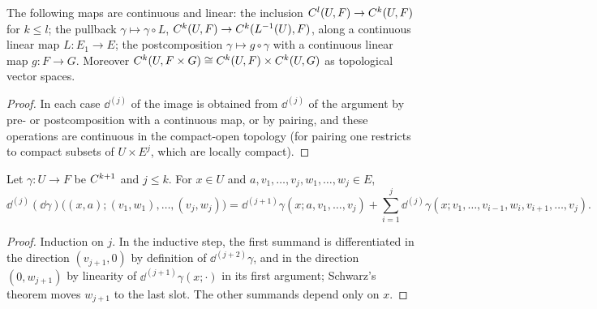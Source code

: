 \begin{proposition}
  \label{prop:ck-linear-operations}
  \leanok
  The following maps are continuous and linear: the inclusion
  $C^{l}(U, F) \to C^{k}(U, F)$ for $k \leq l$; the pullback $\gamma \mapsto \gamma \circ L$,
  $C^{k}(U, F) \to C^{k}(L^{-1}(U), F)$, along a continuous linear map $L \colon E_1 \to E$;
  the postcomposition $\gamma \mapsto g \circ \gamma$ with a continuous linear map $g \colon F
  \to G$. Moreover $C^{k}(U, F \times G) \cong C^{k}(U, F) \times C^{k}(U, G)$ as
  topological vector spaces.
\end{proposition}

\begin{proof}
  \leanok
  In each case $\dd^{(j)}$ of the image is obtained from $\dd^{(j)}$ of the argument by pre- or
  postcomposition with a continuous map, or by pairing, and these operations are continuous in
  the compact-open topology (for pairing one restricts to compact subsets of $U \times E^j$,
  which are locally compact).
\end{proof}

\begin{lemma}
  \label{lem:iterated-d}
  \leanok
  Let $\gamma \colon U \to F$ be $C^{k+1}$ and $j \leq k$. For $x \in U$ and
  $a, v_1, \dots, v_j, w_1, \dots, w_j \in E$,
  \[
    \dd^{(j)}(\dd\gamma)\bigl((x, a); (v_1, w_1), \dots, (v_j, w_j)\bigr)
      = \dd^{(j+1)}\gamma(x; a, v_1, \dots, v_j)
        + \sum_{i=1}^{j} \dd^{(j)}\gamma(x; v_1, \dots, v_{i-1}, w_i, v_{i+1}, \dots, v_j).
  \]
\end{lemma}

\begin{proof}
  \leanok
  Induction on $j$. In the inductive step, the first summand is differentiated in the direction
  $(v_{j+1}, 0)$ by definition of $\dd^{(j+2)}\gamma$, and in the direction $(0, w_{j+1})$ by
  linearity of $\dd^{(j+1)}\gamma(x; \cdot)$ in its first argument; Schwarz's theorem moves
  $w_{j+1}$ to the last slot. The other summands depend only on $x$.
\end{proof}

